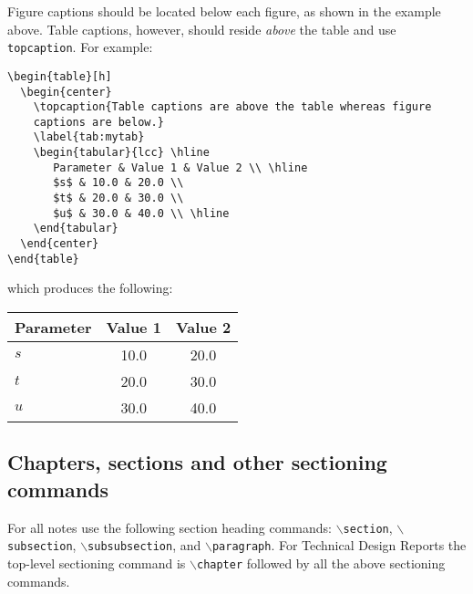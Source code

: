 Figure captions should be located below each figure, as shown in the
example above. Table captions, however, should reside \emph{above}
the table and use \texttt{topcaption}.  For example:
%
\begin{verbatim}
\begin{table}[h]
  \begin{center}
    \topcaption{Table captions are above the table whereas figure
    captions are below.}
    \label{tab:mytab}
    \begin{tabular}{lcc} \hline
       Parameter & Value 1 & Value 2 \\ \hline
       $s$ & 10.0 & 20.0 \\
       $t$ & 20.0 & 30.0 \\
       $u$ & 30.0 & 40.0 \\ \hline
    \end{tabular}
  \end{center}
\end{table}
\end{verbatim}
%
which produces the following:
%
\begin{table}[h]
  \begin{center}
    \label{tab:mytab}
    \begin{tabular}{lcc} \hline
       Parameter & Value 1 & Value 2 \\ \hline
       $s$ & 10.0 & 20.0 \\
       $t$ & 20.0 & 30.0 \\
       $u$ & 30.0 & 40.0 \\ \hline
    \end{tabular}
  \end{center}
\end{table}
%




\subsection{Chapters, sections and other sectioning commands}

For all notes use the following
section heading commands:
\texttt{$\backslash${}section},
\texttt{$\backslash${}subsection},
\texttt{$\backslash${}subsubsection}, and
\texttt{$\backslash${}paragraph}.
For Technical Design Reports the top-level sectioning command
is \texttt{$\backslash${}chapter} followed by all the above
sectioning commands.


